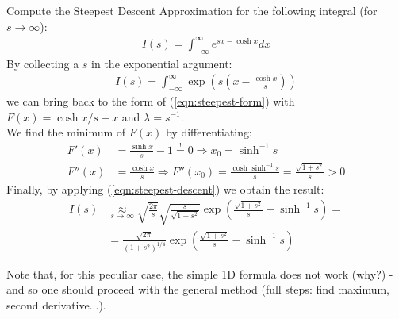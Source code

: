 \documentclass[../template.tex]{subfiles}
\begin{document}
\begin{exo} Compute the Steepest Descent Approximation for the following integral (for $s \to \infty$):
\begin{align*}
    I(s) = \int_{-\infty}^{\infty} e^{sx - \cosh x} dx
\end{align*} 
By collecting a $s$ in the exponential argument:
\begin{align*}
    I(s) = \int_{-\infty}^{\infty} \exp\left(s\left(x-\frac{\cosh x}{s} \right)\right)
\end{align*}
we can bring back to the form of (\ref{eqn:steepest-form}) with $F(x) = \cosh x/s -x$ and $\lambda = s^{-1}$.\\
We find the minimum of $F(x)$ by differentiating:
\begin{align*}
    F'(x) &= \frac{\sinh x}{s} -1 \overset{!}{=} 0 \Rightarrow x_0 = \sinh^{-1} s\\
    F''(x) &=  \frac{\cosh x}{s} \Rightarrow F''(x_0) = \frac{\cosh \sinh^{-1} s}{s} = \frac{\sqrt{1+s^2}}{s} > 0 
\end{align*}   
Finally, by applying (\ref{eqn:steepest-descent}) we obtain the result:
\begin{align*}
    I(s) &\underset{s \to \infty}{\approx} \sqrt{\frac{2 \pi}{s} } \sqrt{\frac{s}{\sqrt{1+s^2}} } \exp\left(\frac{\sqrt{1+s^2}}{s} - \sinh^{-1} s \right) =\\
    &= \frac{\sqrt{2\pi}}{(1+s^2)^{1/4}} \exp\left(\frac{\sqrt{1+s^2}}{s} - \sinh^{-1}s \right) 
\end{align*}

Note that, for this peculiar case, the simple 1D formula does not work (why?) - and so one should proceed with the general method (full steps: find maximum, second derivative...).
\end{exo}
\end{document}

